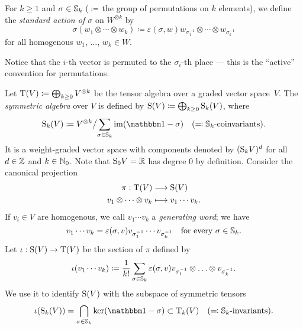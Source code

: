 \documentclass[\MainFolder/Text.tex]{subfiles}
\begin{document}

\begin{Definition}\label{Def:Permutations}
For $k\ge 1$ and $\sigma\in \mathbb{S}_k$ ($\coloneqq$\,the group of permutations on $k$ elements), we define the \emph{standard action of $\sigma$} on $W^{\otimes k}$ by 
\begin{equation}\label{Eq:Perm}
\sigma(w_1 \otimes \dotsb \otimes w_k) \coloneqq  \varepsilon(\sigma,w) w_{\sigma_1^{-1}}\otimes \dotsb \otimes w_{\sigma_k^{-1}}
\end{equation}
for all homogenous $w_1$, $\dotsc$, $w_k\in W$.
\end{Definition}

Notice that the $i$-th vector is permuted to the $\sigma_i$-th place --- this is the ``active'' convention for permutations.


\begin{Definition}\label{Def:SymAlgebra}
Let $\mathrm{T}(V)\coloneqq \bigoplus_{k\ge 0} V^{\otimes k}$ be the tensor algebra over a graded vector space~$V$. The \emph{symmetric algebra} over $V$ is defined by $\mathrm{S}(V)\coloneqq \bigoplus_{k\ge 0} \mathrm{S}_k(V)$, where
$$ \Sym_k(V) \coloneqq V^{\otimes k} \bigl/ \sum_{\sigma\in \Perm_k} \Im(\Id-\sigma)\quad(\eqqcolon \Perm_k\text{-coinvariants}). $$
It is a weight-graded vector space with components denoted by $(\mathrm{S}_k V)^d$ for all $d\in \mathbb{Z}$ and $k\in \mathbb{N}_0$. Note that $\mathrm{S}_0 V = \mathbb{R}$ has degree $0$ by definition. Consider the canonical projection
$$\begin{aligned}
\pi : \mathrm{T}(V) &\longrightarrow \mathrm{S}(V) \\
v_1\otimes \dotsb \otimes v_k &\longmapsto v_1\dotsb v_k.
\end{aligned}$$
If $v_i\in V$ are homogenous, we call $v_1 \dotsb v_k$ a \emph{generating word}; we have
$$ v_1 \dotsb  v_k = \varepsilon(\sigma,v) v_{\sigma_1^{-1}} \dotsb v_{\sigma_k^{-1}}\quad \text{for every }\sigma\in \mathbb{S}_k. $$
Let $\iota: \mathrm{S}(V) \rightarrow \mathrm{T}(V)$ be the section of $\pi$ defined by 
$$ \iota(v_1\dotsb v_k) \coloneqq \frac{1}{k!}\sum_{\sigma\in\mathbb{S}_k} \varepsilon(\sigma,v) v_{\sigma_1^{-1}}\otimes \ldots \otimes v_{\sigma_k^{-1}}. $$
We use it to identify $\mathrm{S}(V)$ with the subspace of symmetric tensors
$$ \iota(\Sym_k(V)) = \bigcap_{\sigma\in \Perm_k} \Ker(\Id - \sigma) \subset \Ten_k(V)\quad(\eqqcolon\Perm_k\text{-invariants}). $$
\end{Definition}
\end{document}
